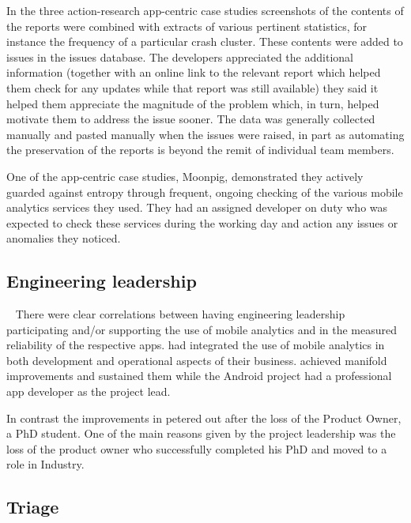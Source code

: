 In the three action-research app-centric case studies screenshots of the contents of the reports were combined with extracts of various pertinent statistics, for instance the frequency of a particular crash cluster. These contents were added to issues in the issues database. The developers appreciated the additional information (together with an online link to the relevant report which helped them check for any updates while that report was still available) they said it helped them appreciate the magnitude of the problem which, in turn, helped motivate them to address the issue sooner. The data was generally collected manually and pasted manually when the issues were raised, in part as automating the preservation of the reports is beyond the remit of individual team members.

One of the app-centric case studies, Moonpig, demonstrated they actively guarded against entropy through frequent, ongoing checking of the various mobile analytics services they used. They had an assigned developer on duty who was expected to check these services during the working day and action any issues or anomalies they noticed.

\subsection{Engineering leadership}~\label{aiu-engineering-leadership-topic}
There were clear correlations between having engineering leadership participating and/or supporting the use of mobile analytics and in the measured reliability of the respective apps.  had integrated the use of mobile analytics in both development and operational aspects of their business.  achieved manifold improvements and sustained them while the Android project had a professional app developer as the project lead. 

In contrast the improvements in  petered out after the loss of the Product Owner, a PhD student. One of the main reasons given by the project leadership was the loss of the product owner who successfully completed his PhD and moved to a role in Industry. 


\subsection{Triage}~\label{aiu-triage-theme}

